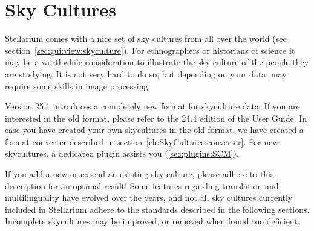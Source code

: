 
\newcommand{\jtag}[1]{\texttt{"#1"}}



\chapter{Sky Cultures}
\label{ch:SkyCultures}


Stellarium comes with a nice set of sky cultures from all
over the world (see section~\ref{sec:gui:view:skyculture}). For ethnographers or
historians of science it may be a worthwhile consideration to
illustrate the sky culture of the people they are studying. It is not
very hard to do so, but depending on your data, may require some
skills in image processing.

Version 25.1 introduces a completely new format for skyculture data. 
If you are interested in the old format, please refer to the 24.4 edition of the User Guide.
In case you have created your own skycultures in the old format, we have created a format converter  described in section~\ref{ch:SkyCultures:converter}.
For new skycultures, a dedicated plugin assists you (\ref{sec:plugins:SCM}).


If you add a new or extend an existing sky culture, please adhere to this description for an optimal result!
Some features regarding translation and multilinguality have evolved
over the years, and not all sky cultures currently included in
Stellarium adhere to the standards described in the following
sections. Incomplete skycultures may be improved, or removed when found too deficient.



